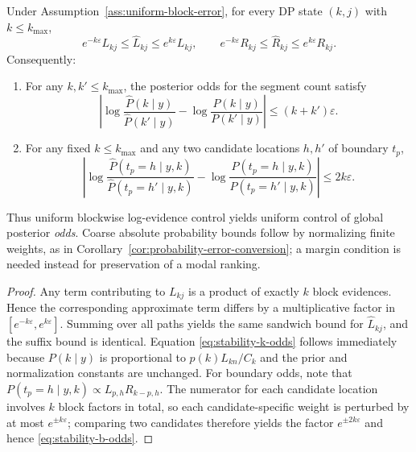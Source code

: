 \begin{proposition}
\label{prop:stability}
Under Assumption~\ref{ass:uniform-block-error}, for every DP state $(k,j)$ with $k\le k_{\max}$,
\[
e^{-k\varepsilon}L_{k j}\le \widehat{L}_{k j}\le e^{k\varepsilon}L_{k j},
\qquad
e^{-k\varepsilon}R_{k j}\le \widehat{R}_{k j}\le e^{k\varepsilon}R_{k j}.
\]
Consequently:
\begin{enumerate}
\item For any $k,k'\le k_{\max}$, the posterior odds for the segment count satisfy
\begin{equation}
\left|
\log\frac{\widehat{P}(k\mid y)}{\widehat{P}(k'\mid y)}
-\log\frac{P(k\mid y)}{P(k'\mid y)}
\right|
\le (k+k')\varepsilon.
\label{eq:stability-k-odds}
\end{equation}
\item For any fixed $k\le k_{\max}$ and any two candidate locations $h,h'$ of boundary $t_p$,
\begin{equation}
\left|
\log\frac{\widehat{P}(t_p=h\mid y,k)}{\widehat{P}(t_p=h'\mid y,k)}
-\log\frac{P(t_p=h\mid y,k)}{P(t_p=h'\mid y,k)}
\right|
\le 2k\varepsilon.
\label{eq:stability-b-odds}
\end{equation}
\end{enumerate}
Thus uniform blockwise log-evidence control yields uniform control of global posterior \emph{odds}. Coarse absolute probability bounds follow by normalizing finite weights, as in Corollary~\ref{cor:probability-error-conversion}; a margin condition is needed instead for preservation of a modal ranking.
\end{proposition}

\begin{proof}
Any term contributing to $L_{k j}$ is a product of exactly $k$ block evidences. Hence the corresponding
approximate term differs by a multiplicative factor in $[e^{-k\varepsilon},e^{k\varepsilon}]$. Summing over all
paths yields the same sandwich bound for $\widehat{L}_{k j}$, and the suffix bound is identical. Equation
\eqref{eq:stability-k-odds} follows immediately because $P(k\mid y)$ is proportional to $p(k)L_{k n}/C_k$ and the
prior and normalization constants are unchanged. For boundary odds, note that
$P(t_p=h\mid y,k)\propto L_{p,h}R_{k-p,h}$. The numerator for each candidate location involves $k$ block factors in
total, so each candidate-specific weight is perturbed by at most $e^{\pm k\varepsilon}$; comparing two candidates
therefore yields the factor $e^{\pm 2k\varepsilon}$ and hence \eqref{eq:stability-b-odds}.
\end{proof}

